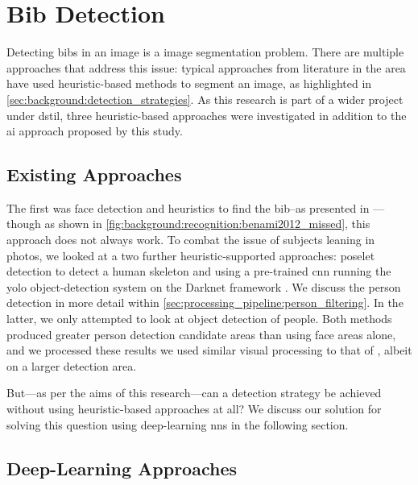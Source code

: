 \section{Bib Detection}
\label{sec:processing_pipeline:pipeline}

Detecting bibs in an image is a image segmentation problem. There are multiple approaches that address this issue: typical approaches from literature in the area have used heuristic-based methods to segment an image, as highlighted in \cref{sec:background:detection_strategies}. As this research is part of a wider project under \gls{dstil}, three heuristic-based approaches were investigated in addition to the  \gls{ai} approach proposed by this study. 

\subsection{Existing Approaches}
\label{sec:processing_pipeline:bib_detection:existing_approaches}

The first was face detection and heuristics to find the bib--as presented in \citep{Benami:2012jf}---though as shown in \cref{fig:background:recognition:benami2012_missed}, this approach does not always work. To combat the issue of subjects leaning in photos, we looked at a two further heuristic-supported approaches: poselet detection to detect a human skeleton \citep{Nguyen:2015vc} and using a pre-trained \gls{cnn} running the \gls{yolo} object-detection system \citep{redmon2016yolo9000} on the Darknet framework \citep{darknet13}. We discuss the person detection in more detail within \cref{sec:processing_pipeline:person_filtering}. In the latter, we only attempted to look at object detection of people. Both methods produced greater person detection candidate areas than using face areas alone, and we processed  these results we used similar visual processing to that of \citet{Benami:2012jf}, albeit on a larger detection area.

But---as per the aims of this research---can a detection strategy be achieved without using heuristic-based approaches at all? We discuss our solution for solving this question using deep-learning \glspl{nn} in the following section.

\subsection{Deep-Learning Approaches}
\label{sec:processing_pipeline:bib_detection:deep_learning}

